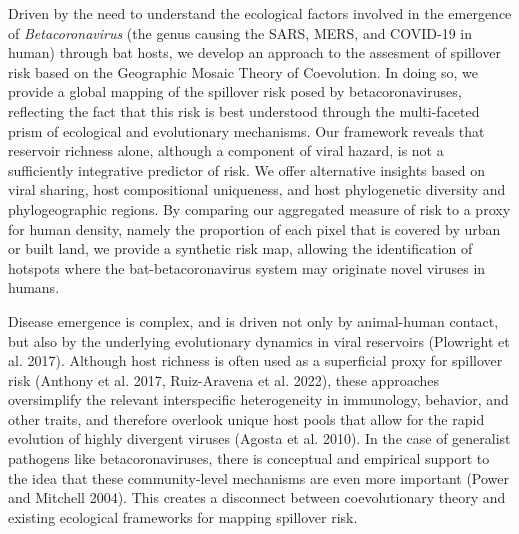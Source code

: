 \documentclass[11pt]{article}
\begin{document}
\vfill
Driven by the need to understand the ecological factors involved in the
emergence of \emph{Betacoronavirus} (the genus causing the SARS, MERS,
and COVID-19 in human) through bat hosts, we develop an approach to the
assesment of spillover risk based on the Geographic Mosaic Theory of
Coevolution. In doing so, we provide a global mapping of the spillover
risk posed by betacoronaviruses, reflecting the fact that this risk is
best understood through the multi-faceted prism of ecological and
evolutionary mechanisms. Our framework reveals that reservoir richness
alone, although a component of viral hazard, is not a sufficiently
integrative predictor of risk. We offer alternative insights based on
viral sharing, host compositional uniqueness, and host phylogenetic
diversity and phylogeographic regions. By comparing our aggregated
measure of risk to a proxy for human density, namely the proportion of
each pixel that is covered by urban or built land, we provide a
synthetic risk map, allowing the identification of hotspots where the
bat-betacoronavirus system may originate novel viruses in humans.



\vfill

\clearpage
\linenumbers
\pagestyle{normal}

Disease emergence is complex, and is driven not only by animal-human
contact, but also by the underlying evolutionary dynamics in viral
reservoirs (Plowright et al. 2017). Although host richness is often used
as a superficial proxy for spillover risk (Anthony et al. 2017,
Ruiz-Aravena et al. 2022), these approaches oversimplify the relevant
interspecific heterogeneity in immunology, behavior, and other traits,
and therefore overlook unique host pools that allow for the rapid
evolution of highly divergent viruses (Agosta et al. 2010). In the case
of generalist pathogens like betacoronaviruses, there is conceptual and
empirical support to the idea that these community-level mechanisms are
even more important (Power and Mitchell 2004). This creates a disconnect
between coevolutionary theory and existing ecological frameworks for
mapping spillover risk.
\end{document}
